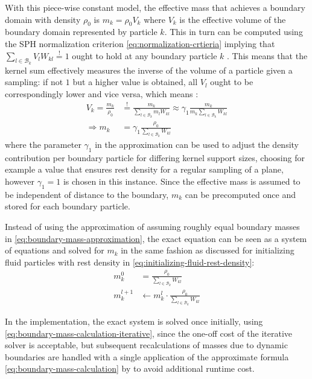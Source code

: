 \documentclass[oneside, a4paper]{book}
\begin{document}
    With this piece-wise constant model, the effective mass that achieves a boundary domain with density $\rho_0$ is $m_k = \rho_0V_k$ where $V_k$ is the effective volume of the boundary domain represented by particle $k$. This in turn can be computed using the SPH normalization criterion \autoref{eq:normalization-crtieria} implying that $\sum_{l\in\mathcal{B}_k} V_l W_{kl}\overset{!}{=} 1$ ought to hold at any boundary particle $k$ \autocite{versatile-boundary-akinci}. This means that the kernel sum effectively measures the inverse of the volume of a particle given a sampling: if not $1$ but a higher value is obtained, all $V_l$ ought to be correspondingly lower and vice versa, which means \autocite{versatile-boundary-akinci}: 
    \begin{align}
      V_k = \frac{m_k}{\rho_0} &\overset{!}{=} \frac{m_k}{\sum_{l\in\mathcal{B}_k} m_l W_{kl}} \approx \gamma_1 \frac{ m_k}{m_k \sum_{l\in\mathcal{B}_k} W_{kl}}\label{eq:boundary-mass-approximation}\\
      \Longrightarrow m_k &= \gamma_1 \frac{\rho_0}{\sum_{l\in\mathcal{B}_k} W_{kl}}\label{eq:boundary-mass-calculation}
    \end{align}
    where the parameter $\gamma_1$ in the approximation can be used to adjust the density contribution per boundary particle for differing kernel support sizes, choosing for example a value that ensures rest density for a regular sampling of a plane, however $\gamma_1=1$ is chosen in this instance. 
    Since the effective mass is assumed to be independent of distance to the boundary, $m_k$ can be precomputed once and stored for each boundary particle.
    
    Instead of using the approximation of assuming roughly equal boundary masses in \autoref{eq:boundary-mass-approximation}, the exact equation can be seen as a system of equations and solved for $m_k$ in the same fashion as discussed for initializing fluid particles with rest density in \autoref{eq:initializing-fluid-rest-density}:
    \begin{align}
      m_k^0 &= \frac{\rho_0}{\sum_{l\in\mathcal{B}_k} W_{kl}}\\
      m_k^{l+1} &\gets m_k^l \cdot \frac{\rho_0}{\sum_{l\in\mathcal{B}_k} W_{kl}}\label{eq:boundary-mass-calculation-iterative}
    \end{align}

    In the implementation, the exact system is solved once initially, using \autoref{eq:boundary-mass-calculation-iterative}, since the one-off cost of the iterative solver is acceptable, but subsequent recalculations of masses due to dynamic boundaries are handled with a single application of the approximate formula \autoref{eq:boundary-mass-calculation} by \autocite[Akinci et al.]{versatile-boundary-akinci} to avoid additional runtime cost.
    
\end{document}
